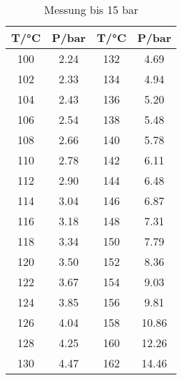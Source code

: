 \begin{table}
  \centering
  \caption{Messung bis 15 bar}
  \label{tab:data2}
\begin{tabular}{c c c c}
  \toprule
  T/\si{\celsius} &   P/\si{\bar}  &   T/\si{\celsius} &   P/\si{\bar} \\
  \midrule
  100  &   2.24   &   132  &   4.69  \\
  102  &   2.33   &   134  &   4.94  \\
  104  &   2.43   &   136  &   5.20  \\
  106  &   2.54   &   138  &   5.48  \\
  108  &   2.66   &   140  &   5.78  \\
  110  &   2.78   &   142  &   6.11  \\
  112  &   2.90   &   144  &   6.48  \\
  114  &   3.04   &   146  &   6.87  \\
  116  &   3.18   &   148  &   7.31  \\
  118  &   3.34   &   150  &   7.79  \\
  120  &   3.50   &   152  &   8.36  \\
  122  &   3.67   &   154  &   9.03  \\
  124  &   3.85   &   156  &   9.81  \\
  126  &   4.04   &   158  &  10.86  \\
  128  &   4.25   &   160  &  12.26  \\
  130  &   4.47   &   162  &  14.46  \\
  \bottomrule
  \end{tabular}
\end{table}

